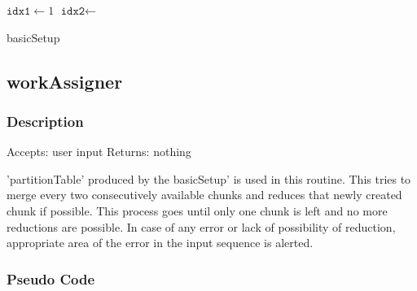 \documentclass{article}
\begin{document}
\begin{flushleft}
\begin{algorithm}


$\texttt{idx1} \leftarrow 1$\;
$\texttt{idx2} \leftarrow $ \BL\;


\caption{basicSetup}\label{algo_basicSetup}
\end{algorithm}\DecMargin{3em}

\newpage

\subsection{workAssigner}

\subsubsection*{Description}

Accepts: user input \BlankLine
Returns: nothing \BlankLine

'partitionTable' produced by the basicSetup' is used in this routine. This tries to merge every two consecutively available chunks and reduces that newly created chunk if possible. This process goes until only one chunk is left and no more reductions are possible.
\BlankLine
In case of any error or lack of possibility of reduction, appropriate area of the error in the input sequence is alerted.

\subsubsection*{Pseudo Code}

\IncMargin{3em}
\begin{algorithm}





\end{algorithm}
\end{flushleft}
\end{document}
